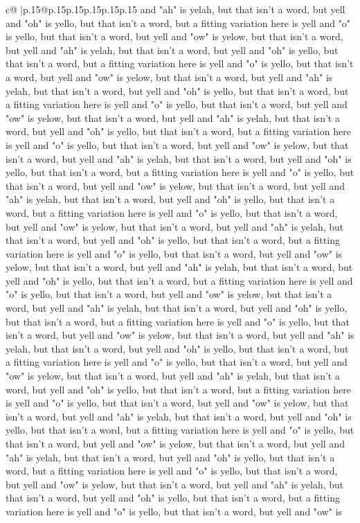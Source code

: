 \documentclass{article}
\begin{document}
{\begin{supertabular}{c@{$\;$}|p{.15\linewidth}@{}p{.15\linewidth}p{.15\linewidth}p{.15\linewidth}p{.15\linewidth}p{.15\linewidth}}
{{{and "ah" is yelah, but that isn't a word, but yell and "oh" is yello, but that isn't a word, but a fitting variation here is yell and "o" is yello, but that isn't a word, but yell and "ow" is yelow, but that isn't a word, but yell and "ah" is yelah, but that isn't a word, but yell and "oh" is yello, but that isn't a word, but a fitting variation here is yell and "o" is yello, but that isn't a word, but yell and "ow" is yelow, but that isn't a word, but yell and "ah" is yelah, but that isn't a word, but yell and "oh" is yello, but that isn't a word, but a fitting variation here is yell and "o" is yello, but that isn't a word, but yell and "ow" is yelow, but that isn't a word, but yell and "ah" is yelah, but that isn't a word, but yell and "oh" is yello, but that isn't a word, but a fitting variation here is yell and "o" is yello, but that isn't a word, but yell and "ow" is yelow, but that isn't a word, but yell and "ah" is yelah, but that isn't a word, but yell and "oh" is yello, but that isn't a word, but a fitting variation here is yell and "o" is yello, but that isn't a word, but yell and "ow" is yelow, but that isn't a word, but yell and "ah" is yelah, but that isn't a word, but yell and "oh" is yello, but that isn't a word, but a fitting variation here is yell and "o" is yello, but that isn't a word, but yell and "ow" is yelow, but that isn't a word, but yell and "ah" is yelah, but that isn't a word, but yell and "oh" is yello, but that isn't a word, but a fitting variation here is yell and "o" is yello, but that isn't a word, but yell and "ow" is yelow, but that isn't a word, but yell and "ah" is yelah, but that isn't a word, but yell and "oh" is yello, but that isn't a word, but a fitting variation here is yell and "o" is yello, but that isn't a word, but yell and "ow" is yelow, but that isn't a word, but yell and "ah" is yelah, but that isn't a word, but yell and "oh" is yello, but that isn't a word, but a fitting variation here is yell and "o" is yello, but that isn't a word, but yell and "ow" is yelow, but that isn't a word, but yell and "ah" is yelah, but that isn't a word, but yell and "oh" is yello, but that isn't a word, but a fitting variation here is yell and "o" is yello, but that isn't a word, but yell and "ow" is yelow, but that isn't a word, but yell and "ah" is yelah, but that isn't a word, but yell and "oh" is yello, but that isn't a word, but a fitting variation here is yell and "o" is yello, but that isn't a word, but yell and "ow" is yelow, but that isn't a word, but yell and "ah" is yelah, but that isn't a word, but yell and "oh" is yello, but that isn't a word, but a fitting variation here is yell and "o" is yello, but that isn't a word, but yell and "ow" is yelow, but that isn't a word, but yell and "ah" is yelah, but that isn't a word, but yell and "oh" is yello, but that isn't a word, but a fitting variation here is yell and "o" is yello, but that isn't a word, but yell and "ow" is yelow, but that isn't a word, but yell and "ah" is yelah, but that isn't a word, but yell and "oh" is yello, but that isn't a word, but a fitting variation here is yell and "o" is yello, but that isn't a word, but yell and "ow" is }}}
\end{supertabular}}
\end{document}

